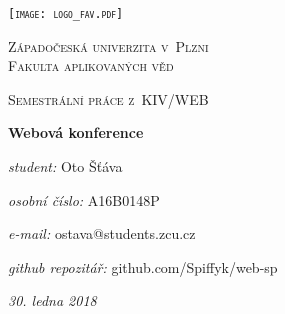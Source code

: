 \begin{titlepage}
    \centering
    {\scshape\texttt{[image: logo\_fav.pdf]} \par}
    {\scshape\LARGE Západočeská univerzita v~Plzni\\ Fakulta aplikovaných věd \par}
    \vspace{1cm}
    {\scshape\Large Semestrální práce z~KIV/WEB\par}
    \vspace{1.5cm}
    {\huge\bfseries Webová konference\par}
    \vspace{2cm}
    {\Large \textit{student:} Oto Šťáva\par}
    {\Large \textit{osobní číslo:} A16B0148P\par}
    {\Large \textit{e-mail:} ostava@students.zcu.cz\par}
    {\Large \textit{github repozitář:} github.com/Spiffyk/web-sp\par}
    \vspace{1cm}
    {\Large\itshape 30. ledna 2018\par}
\end{titlepage}
